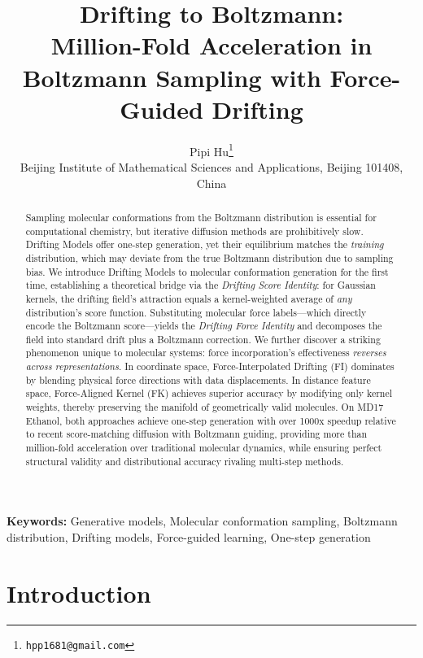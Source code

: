 \documentclass[11pt]{article}
\title{Drifting to Boltzmann:\\ Million-Fold Acceleration in Boltzmann Sampling with Force-Guided Drifting}
\author{Pipi Hu\thanks{\texttt{hpp1681@gmail.com}} \\
  Beijing Institute of Mathematical Sciences and Applications, Beijing 101408, China \\}
\date{}
\newcommand{\keywords}[1]{\par\noindent\textbf{Keywords:} #1}
\begin{document}
\maketitle

\begin{abstract}
Sampling molecular conformations from the Boltzmann distribution is essential for computational chemistry, but iterative diffusion methods are prohibitively slow.
Drifting Models offer one-step generation, yet their equilibrium matches the \emph{training} distribution, which may deviate from the true Boltzmann distribution due to sampling bias.
We introduce Drifting Models to molecular conformation generation for the first time, establishing a theoretical bridge via the \emph{Drifting Score Identity}: for Gaussian kernels, the drifting field's attraction equals a kernel-weighted average of \emph{any} distribution's score function.
Substituting molecular force labels---which directly encode the Boltzmann score---yields the \emph{Drifting Force Identity} and decomposes the field into standard drift plus a Boltzmann correction.
We further discover a striking phenomenon unique to molecular systems: force incorporation's effectiveness \emph{reverses across representations}.
In coordinate space, Force-Interpolated Drifting (FI) dominates by blending physical force directions with data displacements.
In distance feature space, Force-Aligned Kernel (FK) achieves superior accuracy by modifying only kernel weights, thereby preserving the manifold of geometrically valid molecules.
On MD17 Ethanol, both approaches achieve one-step generation with over 1000x speedup relative to recent score-matching diffusion with Boltzmann guiding, providing more than million-fold acceleration over traditional molecular dynamics, while ensuring perfect structural validity and distributional accuracy rivaling multi-step methods.
\end{abstract}

\keywords{Generative models, Molecular conformation sampling, Boltzmann distribution, Drifting models, Force-guided learning, One-step generation}

\section{Introduction}
\label{sec:intro}
\end{document}
